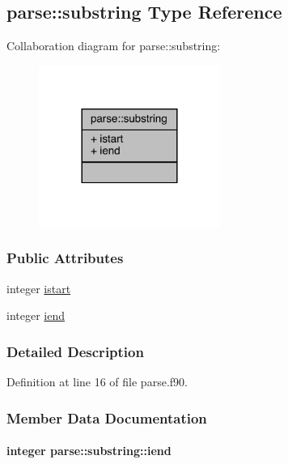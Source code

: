 \hypertarget{structparse_1_1substring}{\subsection{parse\-:\-:substring Type Reference}
\label{structparse_1_1substring}
}


Collaboration diagram for parse\-:\-:substring\-:
\nopagebreak
\begin{figure}[H]
\begin{center}
\leavevmode
\includegraphics[width=168pt]{structparse_1_1substring__coll__graph}
\end{center}
\end{figure}
\subsubsection*{Public Attributes}
\begin{DoxyCompactItemize}
\item 
integer \hyperlink{structparse_1_1substring_a46fe507cebb0c609e8af9b5fd0a4d711}{istart}
\item 
integer \hyperlink{structparse_1_1substring_acc6190848957fd43998d0e87248c4b5f}{iend}
\end{DoxyCompactItemize}


\subsubsection{Detailed Description}


Definition at line 16 of file parse.\-f90.



\subsubsection{Member Data Documentation}
\hypertarget{structparse_1_1substring_acc6190848957fd43998d0e87248c4b5f}{
\paragraph[{iend}]{\setlength{\rightskip}{0pt plus 5cm}integer parse\-::substring\-::iend}}\label{structparse_1_1substring_acc6190848957fd43998d0e87248c4b5f}



